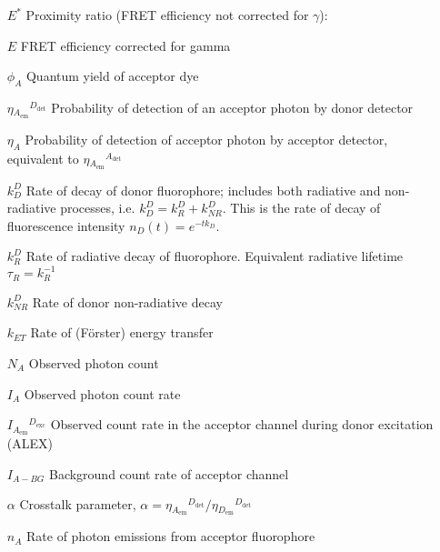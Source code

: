 \documentclass{article}
\newcommand{\emm}[1]{\ensuremath{_{#1_\mathrm{em}}}}   %
\newcommand{\exc}[1]{\ensuremath{^{#1_\mathrm{exc}}}}  %
\newcommand{\dt}[1]{\ensuremath{^{#1_\mathrm{det}}}}   %
\newcommand{\NR}{\ensuremath{\mathit{NR}}}          %
\newcommand{\ET}{\ensuremath{\mathit{ET}}}          %
\begin{document}
\begin{enumerate}
\item[$E^*$] Proximity ratio (FRET efficiency not corrected for $\gamma$):
\item[$E$] FRET efficiency corrected for gamma
\item[$\phi_{A}$] Quantum yield of acceptor dye
\item[$\eta\emm{A}\dt{D}$] Probability of detection of an acceptor photon by donor detector
\item[$\eta_A$] Probability of detection of acceptor photon by acceptor detector, equivalent to $\eta\emm{A}\dt{A}$
\item[$k^D_D$] Rate of decay of donor fluorophore; includes both radiative and non-radiative processes, i.e. $k^D_D = k^D_R + k^D_\NR$. This is the rate of decay of fluorescence intensity $n_D(t) = e^{-t k_D}$.
\item[$k^D_R$] Rate of radiative decay of fluorophore. Equivalent radiative lifetime $\tau_R = k_R^{-1}$
\item[$k^D_\NR$] Rate of donor non-radiative decay
\item[$k_\ET$] Rate of (F\"orster) energy transfer
\item[$N_A$] Observed photon count
\item[$I_A$] Observed photon count rate
\item[$I\emm{A}\exc{D}$] Observed count rate in the acceptor channel during donor excitation (ALEX)
\item[$I_{A-BG}$] Background count rate of acceptor channel
\item[$\alpha$] Crosstalk parameter, $\alpha = \eta\emm{A}\dt{D} / \eta\emm{D}\dt{D}$
\item[$n_A$] Rate of photon emissions from acceptor fluorophore
\end{enumerate}
\end{document}
